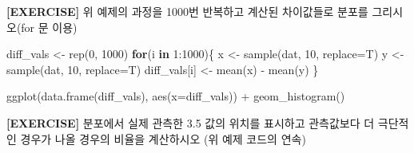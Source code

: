\documentclass[
]{book}
\newenvironment{Shaded}{\begin{snugshade}}{\end{snugshade}}
\newcommand{\AttributeTok}[1]{\textcolor[rgb]{0.77,0.63,0.00}{#1}}
\newcommand{\ControlFlowTok}[1]{\textcolor[rgb]{0.13,0.29,0.53}{\textbf{#1}}}
\newcommand{\DecValTok}[1]{\textcolor[rgb]{0.00,0.00,0.81}{#1}}
\newcommand{\FunctionTok}[1]{\textcolor[rgb]{0.00,0.00,0.00}{#1}}
\newcommand{\NormalTok}[1]{#1}
\newcommand{\OtherTok}[1]{\textcolor[rgb]{0.56,0.35,0.01}{#1}}
\newcommand{\SpecialCharTok}[1]{\textcolor[rgb]{0.00,0.00,0.00}{#1}}
\begin{document}
\textbf{{[}EXERCISE{]}} 위 예제의 과정을 1000번 반복하고 계산된 차이값들로 분포를 그리시오(for 문 이용)

\begin{Shaded}
\begin{Highlighting}[]
\NormalTok{diff\_vals }\OtherTok{\textless{}{-}} \FunctionTok{rep}\NormalTok{(}\DecValTok{0}\NormalTok{, }\DecValTok{1000}\NormalTok{)}
\ControlFlowTok{for}\NormalTok{(i }\ControlFlowTok{in} \DecValTok{1}\SpecialCharTok{:}\DecValTok{1000}\NormalTok{)\{}
\NormalTok{  x }\OtherTok{\textless{}{-}} \FunctionTok{sample}\NormalTok{(dat, }\DecValTok{10}\NormalTok{, }\AttributeTok{replace=}\NormalTok{T)}
\NormalTok{  y }\OtherTok{\textless{}{-}} \FunctionTok{sample}\NormalTok{(dat, }\DecValTok{10}\NormalTok{, }\AttributeTok{replace=}\NormalTok{T)}
\NormalTok{  diff\_vals[i] }\OtherTok{\textless{}{-}} \FunctionTok{mean}\NormalTok{(x) }\SpecialCharTok{{-}} \FunctionTok{mean}\NormalTok{(y)}
\NormalTok{\}}

\FunctionTok{ggplot}\NormalTok{(}\FunctionTok{data.frame}\NormalTok{(diff\_vals), }\FunctionTok{aes}\NormalTok{(}\AttributeTok{x=}\NormalTok{diff\_vals)) }\SpecialCharTok{+}
  \FunctionTok{geom\_histogram}\NormalTok{()}
\end{Highlighting}
\end{Shaded}

\textbf{{[}EXERCISE{]}} 분포에서 실제 관측한 3.5 값의 위치를 표시하고 관측값보다 더 극단적인 경우가 나올 경우의 비율을 계산하시오 (위 예제 코드의 연속)
\end{document}
